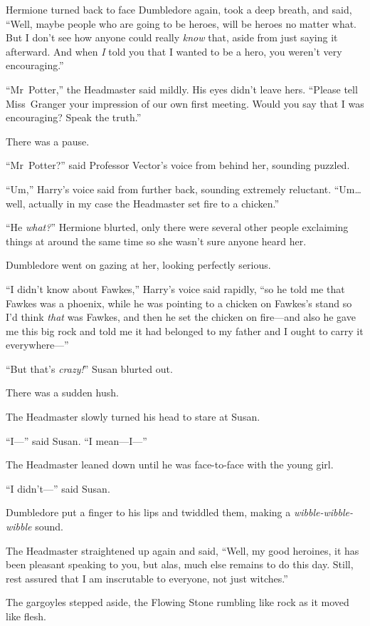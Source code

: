 Hermione turned back to face Dumbledore again, took a deep breath, and said, “Well, maybe people who are going to be heroes, will be heroes no matter what. But I don’t see how anyone could really \emph{know} that, aside from just saying it afterward. And when \emph{I} told you that I wanted to be a hero, you weren’t very encouraging.”

“Mr~Potter,” the Headmaster said mildly. His eyes didn’t leave hers. “Please tell Miss~Granger your impression of our own first meeting. Would you say that I was encouraging? Speak the truth.”

There was a pause.

“Mr~Potter?” said Professor Vector’s voice from behind her, sounding puzzled.

“Um,” Harry’s voice said from further back, sounding extremely reluctant. “Um…well, actually in my case the Headmaster set fire to a chicken.”

“He \emph{what?}” Hermione blurted, only there were several other people exclaiming things at around the same time so she wasn’t sure anyone heard her.

Dumbledore went on gazing at her, looking perfectly serious.

“I didn’t know about Fawkes,” Harry’s voice said rapidly, “so he told me that Fawkes was a phoenix, while he was pointing to a chicken on Fawkes’s stand so I’d think \emph{that} was Fawkes, and then he set the chicken on fire—and also he gave me this big rock and told me it had belonged to my father and I ought to carry it everywhere—”

“But that’s \emph{crazy!}” Susan blurted out.

There was a sudden hush.

The Headmaster slowly turned his head to stare at Susan.

“I—” said Susan. “I mean—I—”

The Headmaster leaned down until he was face-to-face with the young girl.

“I didn’t—” said Susan.

Dumbledore put a finger to his lips and twiddled them, making a
\emph{wibble-wibble-wibble} sound.

The Headmaster straightened up again and said, “Well, my good heroines, it has been pleasant speaking to you, but alas, much else remains to do this day. Still, rest assured that I am inscrutable to everyone, not just witches.”

The gargoyles stepped aside, the Flowing Stone rumbling like rock as it moved like flesh.

